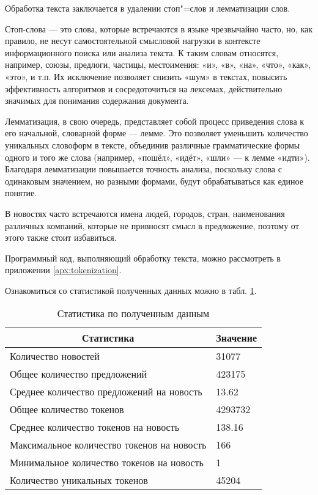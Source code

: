 \documentclass[coursework]{SCWorks}
\begin{document}
Обработка текста заключается в удалении стоп"=слов и лемматизации слов.

Стоп-слова — это слова, которые встречаются в языке чрезвычайно часто, но, как правило, не несут самостоятельной смысловой нагрузки в контексте информационного поиска или анализа текста. К таким словам относятся, например, союзы, предлоги, частицы, местоимения: «и», «в», «на», «что», «как», «это», и т.п. Их исключение позволяет снизить «шум» в текстах, повысить эффективность алгоритмов и сосредоточиться на лексемах, действительно значимых для понимания содержания документа.
  
Лемматизация, в свою очередь, представляет собой процесс приведения слова к его начальной, словарной форме — лемме. Это позволяет уменьшить количество уникальных словоформ в тексте, объединив различные грамматические формы одного и того же слова (например, «пошёл», «идёт», «шли» — к лемме «идти»). Благодаря лемматизации повышается точность анализа, поскольку слова с одинаковым значением, но разными формами, будут обрабатываться как единое понятие.

В новостях часто встречаются имена людей, городов, стран, наименования различных компаний, которые не привносят смысл в предложение, поэтому от этого также стоит избавиться.

Программный код, выполняющий обработку текста, можно рассмотреть в приложении \ref{apx:tokenization}.

Ознакомиться со статистикой полученных данных можно в табл. \ref{table:preprocess}.
\begin{table}[!h]
    \centering
    \begin{tabular}{|l|l|}
    \hline
    \multicolumn{1}{|c|}{\textbf{Статистика}}  & \multicolumn{1}{c|}{\textbf{Значение}} \\ \hline
    Количество новостей                        & 31077                                  \\ \hline
    Общее количество предложений               & 423175                                 \\ \hline
    Среднее количество предложений на новость  & 13.62                                  \\ \hline
    Общее количество токенов                   & 4293732                                \\ \hline
    Среднее количество токенов на новость      & 138.16                                 \\ \hline
    Максимальное количество токенов на новость & 166                                    \\ \hline
    Минимальное количество токенов на новость  & 1                                      \\ \hline
    Количество уникальных токенов              & 45204                                  \\ \hline
    \end{tabular} 
    \caption{Статистика по полученным данным}
    \label{table:preprocess}
\end{table}
\end{document}

